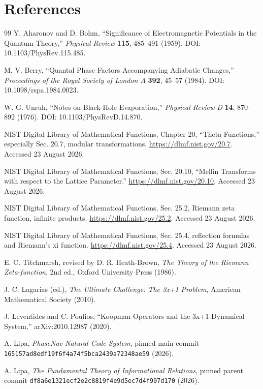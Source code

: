 \section{References}
\begin{thebibliography}{99}
Y. Aharonov and D. Bohm, ``Significance of Electromagnetic Potentials in the Quantum Theory,'' \emph{Physical Review} \textbf{115}, 485--491 (1959). DOI: 10.1103/PhysRev.115.485.

M. V. Berry, ``Quantal Phase Factors Accompanying Adiabatic Changes,'' \emph{Proceedings of the Royal Society of London A} \textbf{392}, 45--57 (1984). DOI: 10.1098/rspa.1984.0023.

W. G. Unruh, ``Notes on Black-Hole Evaporation,'' \emph{Physical Review D} \textbf{14}, 870--892 (1976). DOI: 10.1103/PhysRevD.14.870.

NIST Digital Library of Mathematical Functions, Chapter 20, ``Theta Functions,'' especially Sec. 20.7, modular transformations. \url{https://dlmf.nist.gov/20.7}. Accessed 23 August 2026.

NIST Digital Library of Mathematical Functions, Sec. 20.10, ``Mellin Transforms with respect to the Lattice Parameter.'' \url{https://dlmf.nist.gov/20.10}. Accessed 23 August 2026.

NIST Digital Library of Mathematical Functions, Sec. 25.2, Riemann zeta function, infinite products. \url{https://dlmf.nist.gov/25.2}. Accessed 23 August 2026.

NIST Digital Library of Mathematical Functions, Sec. 25.4, reflection formulas and Riemann's xi function. \url{https://dlmf.nist.gov/25.4}. Accessed 23 August 2026.

E. C. Titchmarsh, revised by D. R. Heath-Brown, \emph{The Theory of the Riemann Zeta-function}, 2nd ed., Oxford University Press (1986).

J. C. Lagarias (ed.), \emph{The Ultimate Challenge: The 3x+1 Problem}, American Mathematical Society (2010).

J. Leventides and C. Poulios, ``Koopman Operators and the 3x+1-Dynamical System,'' arXiv:2010.12987 (2020).

A. Lipa, \emph{PhaseNav Natural Code System}, pinned main commit \texttt{165157ad8edf19f6f4a74f5bca2439a72348ae59} (2026).

A. Lipa, \emph{The Fundamental Theory of Informational Relations}, pinned parent commit \texttt{df8a6e1321ecf2e2c8819f4e9d5ec7d4f997d170} (2026).
\end{thebibliography}
